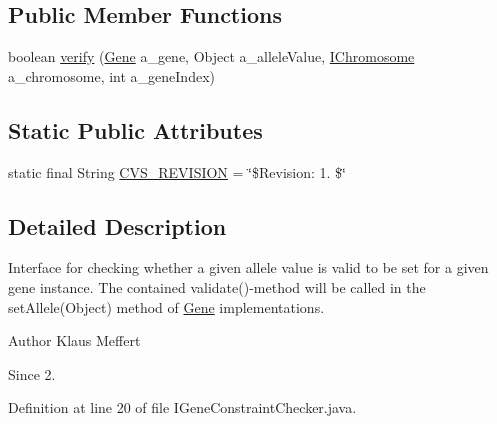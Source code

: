 \subsection*{Public Member Functions}
\begin{DoxyCompactItemize}
\item 
boolean \hyperlink{interfaceorg_1_1jgap_1_1_i_gene_constraint_checker_abf34442f71a7a860d42b3efc8554efb4}{verify} (\hyperlink{interfaceorg_1_1jgap_1_1_gene}{Gene} a\-\_\-gene, Object a\-\_\-allele\-Value, \hyperlink{interfaceorg_1_1jgap_1_1_i_chromosome}{I\-Chromosome} a\-\_\-chromosome, int a\-\_\-gene\-Index)
\end{DoxyCompactItemize}
\subsection*{Static Public Attributes}
\begin{DoxyCompactItemize}
\item 
static final String \hyperlink{interfaceorg_1_1jgap_1_1_i_gene_constraint_checker_a78e823030e27800b44a2ad9faacc8ff3}{C\-V\-S\-\_\-\-R\-E\-V\-I\-S\-I\-O\-N} = \char`\"{}\$Revision\-: 1. \$\char`\"{}
\end{DoxyCompactItemize}


\subsection{Detailed Description}
Interface for checking whether a given allele value is valid to be set for a given gene instance. The contained validate()-\/method will be called in the set\-Allele(\-Object) method of \hyperlink{interfaceorg_1_1jgap_1_1_gene}{Gene} implementations.

\begin{DoxyAuthor}{Author}
Klaus Meffert 
\end{DoxyAuthor}
\begin{DoxySince}{Since}
2. 
\end{DoxySince}


Definition at line 20 of file I\-Gene\-Constraint\-Checker.\-java.



